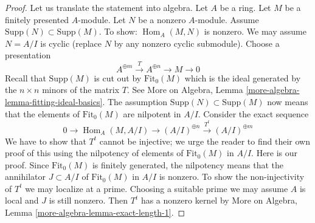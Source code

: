\documentclass[10pt,a4paper]{amsart}
\theoremstyle{plain}
\theoremstyle{definition}
\theoremstyle{remark}
\numberwithin{equation}{subsection}
\def\Hom{\mathop{\mathrm{Hom}}\nolimits}
\begin{document}
\begin{proof}
Let us translate the statement into algebra. Let $A$ be a ring. Let $M$ be a
finitely presented $A$-module. Let $N$ be a nonzero $A$-module. Assume
$\text{Supp}(N) \subset \text{Supp}(M)$. To show: $\Hom_A(M, N)$ is nonzero.
We may assume $N = A/I$ is cyclic (replace $N$ by any nonzero
cyclic submodule). Choose a presentation
$$
A^{\oplus m} \xrightarrow{T} A^{\oplus n} \to M \to 0
$$
Recall that $\text{Supp}(M)$ is cut out by $\text{Fit}_0(M)$ which
is the ideal generated by the $n \times n$ minors of the matrix $T$.
See More on Algebra, Lemma \ref{more-algebra-lemma-fitting-ideal-basics}.
The assumption $\text{Supp}(N) \subset \text{Supp}(M)$ now means that
the elements of $\text{Fit}_0(M)$ are nilpotent in $A/I$.
Consider the exact sequence
$$
0 \to \Hom_A(M, A/I) \to (A/I)^{\oplus n} \xrightarrow{T^t} (A/I)^{\oplus m}
$$
We have to show that $T^t$ cannot be injective; we urge the reader to
find their own proof of this using the nilpotency of elements of
$\text{Fit}_0(M)$ in $A/I$. Here is our proof.
Since $\text{Fit}_0(M)$ is finitely generated, the nilpotency means that
the annihilator $J \subset A/I$ of $\text{Fit}_0(M)$ in $A/I$ is nonzero.
To show the non-injectivity of $T^t$ we may localize at a prime.
Choosing a suitable prime we may assume $A$ is local and $J$ is still
nonzero. Then $T^t$ has a nonzero kernel by
More on Algebra, Lemma \ref{more-algebra-lemma-exact-length-1}.
\end{proof}
\end{document}
